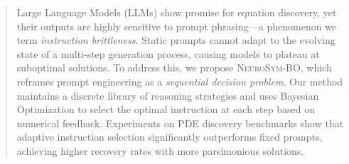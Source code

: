 
\begin{abstract}
	Large Language Models (LLMs) show promise for equation discovery, yet their outputs are highly sensitive to prompt phrasing—a phenomenon we term \textit{instruction brittleness}. Static prompts cannot adapt to the evolving state of a multi-step generation process, causing models to plateau at suboptimal solutions. To address this, we propose \textsc{NeuroSym-BO}, which reframes prompt engineering as a \textit{sequential decision problem}. Our method maintains a discrete library of reasoning strategies and uses Bayesian Optimization to select the optimal instruction at each step based on numerical feedback. Experiments on PDE discovery benchmarks show that adaptive instruction selection significantly outperforms fixed prompts, achieving higher recovery rates with more parsimonious solutions.
\end{abstract}




